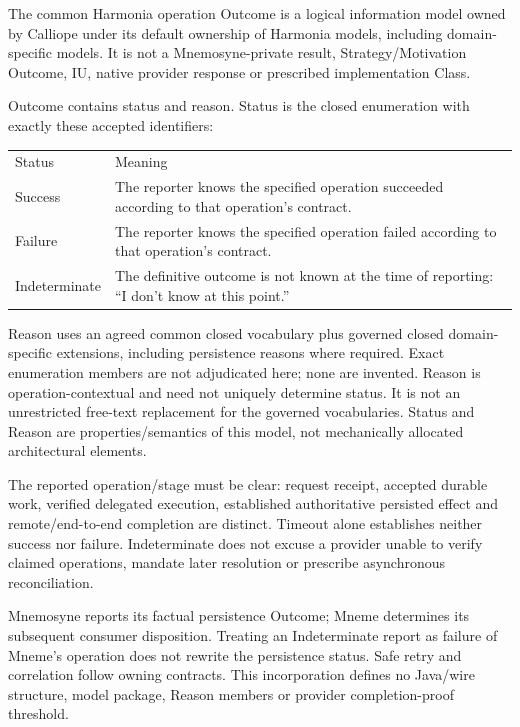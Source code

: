 The common Harmonia operation Outcome is a logical information model owned by Calliope under its default ownership of Harmonia models, including domain-specific models. It is not a Mnemosyne-private result, Strategy/Motivation Outcome, IU, native provider response or prescribed implementation Class.



Outcome contains status and reason. Status is the closed enumeration with exactly these accepted identifiers:



\begin{longtable}{>{\raggedright\arraybackslash}p{}>{\raggedright\arraybackslash}p{}}
Status & Meaning \\
Success & The reporter knows the specified operation succeeded according to that operation's contract. \\
Failure & The reporter knows the specified operation failed according to that operation's contract. \\
Indeterminate & The definitive outcome is not known at the time of reporting: “I don't know at this point.” \\
\end{longtable}


Reason uses an agreed common closed vocabulary plus governed closed domain-specific extensions, including persistence reasons where required. Exact enumeration members are not adjudicated here; none are invented. Reason is operation-contextual and need not uniquely determine status. It is not an unrestricted free-text replacement for the governed vocabularies. Status and Reason are properties/semantics of this model, not mechanically allocated architectural elements.



The reported operation/stage must be clear: request receipt, accepted durable work, verified delegated execution, established authoritative persisted effect and remote/end-to-end completion are distinct. Timeout alone establishes neither success nor failure. Indeterminate does not excuse a provider unable to verify claimed operations, mandate later resolution or prescribe asynchronous reconciliation.



Mnemosyne reports its factual persistence Outcome; Mneme determines its subsequent consumer disposition. Treating an Indeterminate report as failure of Mneme's operation does not rewrite the persistence status. Safe retry and correlation follow owning contracts. This incorporation defines no Java/wire structure, model package, Reason members or provider completion-proof threshold.



